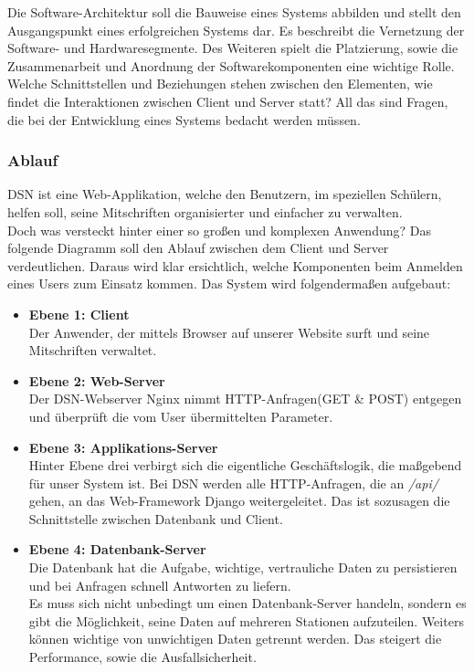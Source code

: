 
Die Software-Architektur soll die Bauweise eines Systems abbilden und stellt den Ausgangspunkt eines erfolgreichen Systems dar. Es beschreibt die Vernetzung der Software- und Hardwaresegmente. Des Weiteren spielt die Platzierung, sowie die Zusammenarbeit und Anordnung der Softwarekomponenten eine wichtige Rolle.\\
Welche Schnittstellen und Beziehungen stehen zwischen den Elementen, wie findet die Interaktionen zwischen Client und Server statt? All das sind Fragen, die bei der Entwicklung eines Systems bedacht werden müssen. \cite{VERTEILTE_SYSTEME}

\subsubsection{Ablauf}
DSN ist eine Web-Applikation, welche den Benutzern, im speziellen Schülern, helfen soll, seine Mitschriften organisierter und einfacher zu verwalten.\\
Doch was versteckt hinter einer so großen und komplexen Anwendung? Das folgende Diagramm soll den Ablauf zwischen dem Client und Server verdeutlichen. Daraus wird klar ersichtlich, welche Komponenten beim Anmelden eines Users zum Einsatz kommen. Das System wird folgendermaßen aufgebaut:
\begin{itemize}
\item \textbf{Ebene 1: Client}\\ Der Anwender, der mittels Browser auf unserer Website surft und seine Mitschriften verwaltet.
\item \textbf{Ebene 2: Web-Server}\\ Der DSN-Webserver Nginx nimmt HTTP-Anfragen(GET \& POST) entgegen und überprüft die vom User übermittelten Parameter.
\item \textbf{Ebene 3: Applikations-Server}\\ Hinter Ebene drei verbirgt sich die eigentliche Geschäftslogik, die maßgebend für unser System ist. Bei DSN werden alle HTTP-Anfragen, die an \textit{/api/} gehen, an das Web-Framework Django weitergeleitet. Das ist sozusagen die Schnittstelle zwischen Datenbank und Client.
\newpage
\item \textbf{Ebene 4: Datenbank-Server}\\ Die Datenbank hat die Aufgabe, wichtige, vertrauliche Daten zu persistieren und bei Anfragen schnell Antworten zu liefern.\\
Es muss sich nicht unbedingt um einen Datenbank-Server handeln, sondern es gibt die Möglichkeit, seine Daten auf mehreren Stationen aufzuteilen. Weiters können wichtige von unwichtigen Daten getrennt werden. Das steigert die Performance, sowie die Ausfallsicherheit.
\end{itemize}

